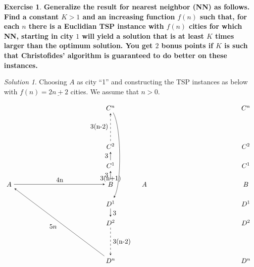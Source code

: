 \documentclass[a4paper,twoside=false,abstract=false,numbers=noenddot,
titlepage=false,headings=small,parskip=half,version=last]{scrartcl}
\theoremstyle{definition}
\newtheorem{exercise}{Exercise}
\theoremstyle{remark}
\newtheorem*{solution}{Solution}
\begin{document}
\begin{exercise}
{\bf
Generalize the result for nearest neighbor (NN) as follows.
Find a constant $K > 1$ and an increasing function $f(n)$ such that,
for each $n$ there is a Euclidian TSP instance with $f(n)$ cities for which NN,
starting in city $1$ will yield a solution that is at least $K$ times larger
than the optimum solution.
You get $2$ bonus points if $K$ is such that Christofides' algorithm is guaranteed
to do better on these instances.
}
\end{exercise}
\begin{solution}
Choosing $A$ as city ``1'' and constructing the TSP instances as below with $f(n)=\underline{2n+2}$ cities. We assume that $n>0$.

\[\begin{matrix}
    \begin{tikzpicture}[>=stealth,->,shorten >=1pt,looseness=.5,auto]
        \node at (-16/3,0) (A) {$A$};
        \node at (0,0) (B) {$B$};
        
        \node at (0,1) (C1) {$C^1$};
        \node at (0,2) (C2) {$C^2$};
        \node at (0,4) (C4) {$C^n$};

        \node at (0,-1) (D1) {$D^1$};
        \node at (0,-2) (D2) {$D^2$};
        \node at (0,-4) (D4) {$D^n$};


        \draw (A) -- (B) node [midway] {4n};
        
        \draw (B) -- (C1) node [midway] {3};
        \draw (C1) -- (C2) node [midway] {3};
        \draw[dashed] (C2) -- (C4) node [midway] {3(n-2)};

        \draw (C4) to[bend left] (D1) node [midway] {3(n+1)};

        \draw (D1) -- (D2) node [midway] {3};
        \draw[dashed] (D2) -- (D4) node [midway] {3(n-2)};

        \draw (D4) -- (A) node [midway] { $5n$ };

    \end{tikzpicture}
    &
    \begin{tikzpicture}[>=stealth,->,shorten >=1pt,looseness=.5,auto]
        \node at (-16/3,0) (A) {$A$};
        \node at (0,0) (B) {$B$};
        
        \node at (0,1) (C1) {$C^1$};
        \node at (0,2) (C2) {$C^2$};
        \node at (0,4) (C4) {$C^n$};

        \node at (0,-1) (D1) {$D^1$};
        \node at (0,-2) (D2) {$D^2$};
        \node at (0,-4) (D4) {$D^n$};



\end{tikzpicture}
\end{matrix}\]
\end{solution}
\end{document}
